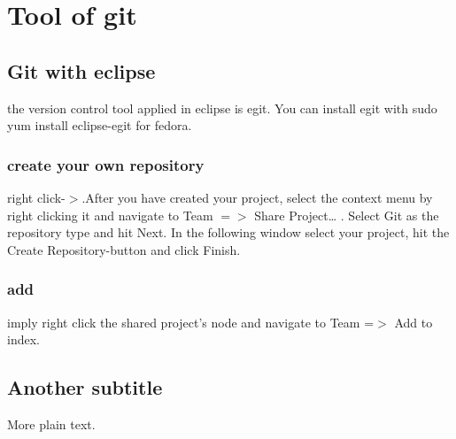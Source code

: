 \documentclass{article}
\begin{document}
\section{Tool of git}

\subsection{Git with eclipse}

the version control tool applied in eclipse is egit. You can install egit with
sudo yum install eclipse-egit for fedora.

\subsubsection{create your own repository}
right click-$>$.After you have created your project, select the context menu by
right clicking it and navigate to Team $=>$ Share Project… . Select Git as the
repository type and hit Next. In the following window select your project, hit the Create Repository-button
and click Finish.
\subsubsection{add}
imply right click the shared project’s node and navigate to Team =$>$ Add to
index.

\subsection{Another subtitle}

More plain text.
\end{document}
